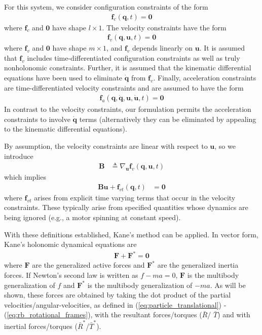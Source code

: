 \documentclass[smallcondensed,final]{svjour3}                     %
\begin{document}
For this system, we consider configuration constraints of the form
\begin{align}
\label{eq:configuration_constraints}
\mathbf{f}_c(\mathbf{q}, t) = \mathbf{0}
\end{align}
where $\mathbf{f}_c$ and $\mathbf{0}$ have shape $l \times 1$.  The velocity
constraints have the form
\begin{align}
\label{eq:velocity_constraints}
\mathbf{f}_v(\mathbf{q}, \mathbf{u}, t) = \mathbf{0}
\end{align}
where $\mathbf{f}_v$ and $\mathbf{0}$ have shape $m \times 1$, and
$\mathbf{f}_v$ depends linearly on $\mathbf{u}$.  It is assumed that
$\mathbf{f}_v$ includes time-differentiated configuration constraints as well
as truly nonholonomic constraints. Further, it is assumed that the kinematic
differential equations have been used to eliminate $\dot{\mathbf{q}}$ from
$\mathbf{f}_v$. Finally, acceleration constraints are time-differentiated
velocity constraints and are assumed to have the form
\begin{align}
\label{eq:acceleration_constraints}
\mathbf{f}_a(\mathbf{q}, \dot{\mathbf{q}}, \mathbf{u}, \dot{\mathbf{u}}, t) =
\mathbf{0}
\end{align}
In contrast to the velocity constraints, our formulation permits the
acceleration constraints to involve $\dot{\mathbf{q}}$ terms (alternatively
they can be eliminated by appealing to the kinematic differential equations).

By assumption, the velocity constraints are linear with respect to
$\mathbf{u}$, so we introduce
\begin{align}
\label{eq:constraint_B}
\mathbf{B} &\triangleq \nabla_{\mathbf{u}} \mathbf{f}_v (\mathbf{q}, \mathbf{u},
t)
\end{align}
which implies
\begin{align}
\label{eq:constraint_Bu0}
\mathbf{B}\mathbf{u} + \mathbf{f}_{vt}(\mathbf{q}, t) &= \mathbf{0}
\end{align}
where $\mathbf{f}_{vt}$ arises from explicit time varying terms that occur in
the velocity constraints. These typically arise from specified quantities whose
dynamics are being ignored (e.g., a motor spinning at constant speed).

With these definitions established, Kane's method can be applied. In vector
form, Kane's holonomic dynamical equations are
\begin{align}
\label{eq:kanes_eq}
\mathbf{F} + \mathbf{F}^* = \mathbf{0}
\end{align}
where $\mathbf{F}$ are the generalized active forces and $\mathbf{F}^*$ are the
generalized inertia forces. If Newton's second law is written as $f - ma = 0$,
$\mathbf{F}$ is the multibody generalization of $f$ and $\mathbf{F}^*$ is the
multibody generalization of $-ma$. As will be shown, these forces are obtained
by taking the dot product of the partial velocities/angular-velocities, as
defined in (\ref{eq:particle_translational}) - (\ref{eq:rb_rotational_frames}),
with the resultant forces/torques ($\bar{R}$/ $\bar{T}$) and with inertial
forces/torques ($\bar{R}^*$/$\bar{T}^*$).
\end{document}
